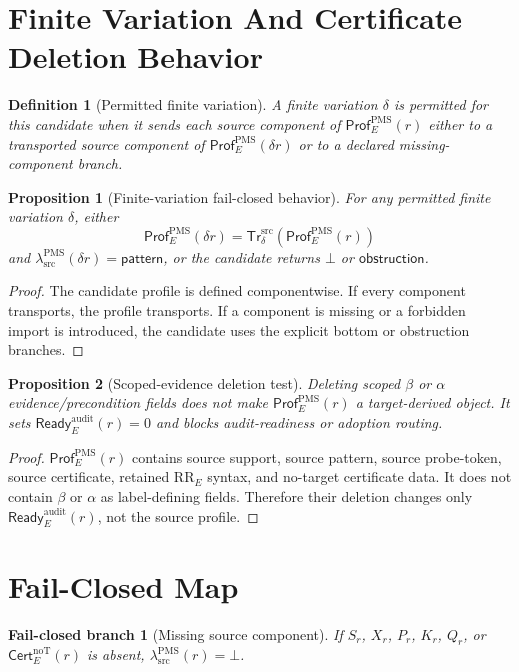 \documentclass[11pt]{article}
\newcommand{\lambdaProf}{\lambda^{\mathrm{PMS}}_{\mathrm{src}}}
\newcommand{\Bottom}{\bot}
\newcommand{\Pattern}{\mathsf{pattern}}
\newcommand{\Obstruction}{\mathsf{obstruction}}
\newcommand{\RRE}{\mathrm{RR}_E}
\newcommand{\Prof}{\mathsf{Prof}^{\mathrm{PMS}}_E}
\newcommand{\Ready}{\mathsf{Ready}^{\mathrm{audit}}_E}
\newcommand{\Cert}{\mathsf{Cert}^{\mathrm{noT}}_E}
\newcommand{\Transport}{\mathsf{Tr}^{\mathrm{src}}}
\newtheorem{definition}{Definition}
\newtheorem{proposition}{Proposition}
\newtheorem{failure}{Fail-closed branch}
\begin{document}
\section{Finite Variation And Certificate Deletion Behavior}

\begin{definition}[Permitted finite variation]
A finite variation \(\delta\) is permitted for this candidate when it sends
each source component of \(\Prof(r)\) either to a transported source component
of \(\Prof(\delta r)\) or to a declared missing-component branch.
\end{definition}

\begin{proposition}[Finite-variation fail-closed behavior]
For any permitted finite variation \(\delta\), either
\[
  \Prof(\delta r)=\Transport_\delta(\Prof(r))
\]
and \(\lambdaProf(\delta r)=\Pattern\), or the candidate returns
\(\Bottom\) or \(\Obstruction\).
\end{proposition}

\begin{proof}
The candidate profile is defined componentwise. If every component transports,
the profile transports. If a component is missing or a forbidden import is
introduced, the candidate uses the explicit bottom or obstruction branches.
\end{proof}

\begin{proposition}[Scoped-evidence deletion test]
Deleting scoped \(\beta\) or \(\alpha\) evidence/precondition fields does not
make \(\Prof(r)\) a target-derived object. It sets \(\Ready(r)=0\) and blocks
audit-readiness or adoption routing.
\end{proposition}

\begin{proof}
\(\Prof(r)\) contains source support, source pattern, source probe-token,
source certificate, retained \(\RRE\) syntax, and no-target certificate data.
It does not contain \(\beta\) or \(\alpha\) as label-defining fields.
Therefore their deletion changes only \(\Ready(r)\), not the source profile.
\end{proof}

\section{Fail-Closed Map}

\begin{failure}[Missing source component]
If \(S_r\), \(X_r\), \(P_r\), \(K_r\), \(Q_r\), or \(\Cert(r)\) is absent,
\(\lambdaProf(r)=\Bottom\).
\end{failure}
\end{document}
